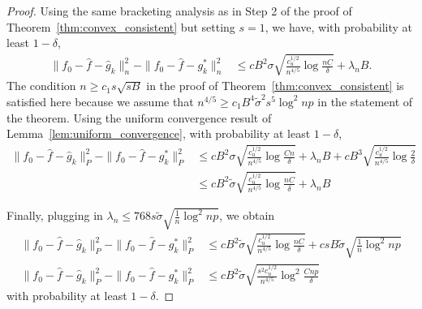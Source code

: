 \begin{proof}
Using the same bracketing analysis as in Step 2 of the proof of Theorem~\ref{thm:convex_consistent} but setting $s=1$, we have, with probability at least $1-\delta$,
\begin{align*}
\| f_0 - \hat{f} - \hat{g}_k \|_n^2 - \|f_0 - \hat{f} - g^*_k \|_n^2 &\leq
  c B^2 \sigma \sqrt{ \frac{c_u^{1/2}}{n^{4/5}} \log \frac{nC}{\delta} }+ \lambda_n B.
\end{align*}
The condition $n \geq c_1 s\sqrt{sB}$ in the proof of Theorem~\ref{thm:convex_consistent} is satisfied here because we assume that $n^{4/5} \geq c_1 B^4 \tilde{\sigma}^2 s^5 \log^2 np$ in the statement of the theorem.
Using the uniform convergence result of Lemma~\ref{lem:uniform_convergence}, with probability at least $1-\delta$,
\begin{align*}
\| f_0 - \hat{f} - \hat{g}_k \|_P^2 - \|f_0 - \hat{f} - g^*_k \|_P^2 &\leq
  c B^2 \sigma \sqrt{ \frac{c_u^{1/2}}{n^{4/5}} \log \frac{Cn}{\delta} }+ \lambda_n B +
  c B^3 \sqrt{\frac{c_u^{1/2}}{n^{4/5}} \log \frac{2}{\delta} } \\
 &\leq c B^2 \tilde{\sigma} \sqrt{\frac{c_u^{1/2}}{n^{4/5}} \log \frac{nC}{\delta}}+ \lambda_n B
\end{align*}

Finally, plugging in $\lambda_n \leq 768 s \tilde{\sigma} \sqrt{
  \frac{1}{n} \log^2 np}$, we obtain
\begin{align*}
\| f_0 - \hat{f} - \hat{g}_k \|_P^2 - \|f_0 - \hat{f} - g^*_k \|_P^2 &
\leq c B^2 \tilde{\sigma} \sqrt{\frac{c_u^{1/2}}{n^{4/5}} \log \frac{nC}{\delta}}+ 
    c s B \tilde{\sigma} \sqrt{\frac{1}{n} \log^2 np}\\
\| f_0 - \hat{f} - \hat{g}_k \|_P^2 - \|f_0 - \hat{f} - g^*_k \|_P^2 &
\leq c B^2 \tilde{\sigma} \sqrt{\frac{s^2 c_u^{1/2}}{n^{4/5}} \log^2 \frac{Cnp}{\delta}}
\end{align*}
with probability at least $1-\delta$.


\end{proof}
